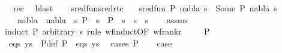 \begin{isabellebody}
\ {}{\isacharparenleft}{\kern0pt}{}{\isacharparenright}{\kern0pt}\ rec\ \isamarkupfalse%
\ blast\isanewline
\ \ \isamarkupfalse%
\isanewline
{}\isamarkupfalse%
%
\endisatagproof
{\isafoldproof}%
%
\isadelimproof
\isanewline
%
\endisadelimproof
\isanewline
{}\isamarkupfalse%
\ sred{\isacharunderscore}{\kern0pt}fun{\isacharunderscore}{\kern0pt}sred{\isacharunderscore}{\kern0pt}rtc{\isacharcolon}{\kern0pt}\isanewline
\ \ \ {\isachardoublequoteopen}sred{\isacharunderscore}{\kern0pt}fun\ {\isacharparenleft}{\kern0pt}P{\isacharcomma}{\kern0pt}\ nabla{\isacharcomma}{\kern0pt}\ s{\isacharparenright}{\kern0pt}\ {\isacharequal}{\kern0pt}\ Some\ {\isacharparenleft}{\kern0pt}P{\isacharprime}{\kern0pt}{\isacharcomma}{\kern0pt}\ nabla{\isacharprime}{\kern0pt}{\isacharcomma}{\kern0pt}\ s{\isacharprime}{\kern0pt}{\isacharparenright}{\kern0pt}{\isachardoublequoteclose}\isanewline
\ \ \ {\isachardoublequoteopen}nabla{\isacharprime}{\kern0pt}\ {\isacharequal}{\kern0pt}\ nabla\ {\isasymand}\ {\isacharparenleft}{\kern0pt}{\isasymexists}s{}{\isachardot}{\kern0pt}\ P\ {\isasymturnstile}\ s{}\ {\isasymleadsto}\isactrlsup {\isacharasterisk}{\kern0pt}\ P{\isacharprime}{\kern0pt}\ {\isasymand}\ s{\isacharprime}{\kern0pt}\ {\isacharequal}{\kern0pt}\ s{}\ {\isasymbullet}\ s{\isacharparenright}{\kern0pt}{\isachardoublequoteclose}\isanewline
%
\isadelimproof
\ \ %
\endisadelimproof
%
\isatagproof
{}\isamarkupfalse%
\ assms\isanewline
{}\isamarkupfalse%
{\isacharparenleft}{\kern0pt}induct\ P\ arbitrary{\isacharcolon}{\kern0pt}\ s\ rule{\isacharcolon}{\kern0pt}\ wf{\isacharunderscore}{\kern0pt}induct{\isacharbrackleft}{\kern0pt}OF\ wf{\isacharunderscore}{\kern0pt}rank{\isacharunderscore}{\kern0pt}r{\isacharbrackright}{\kern0pt}{\isacharparenright}{\kern0pt}\isanewline
\ \ \isamarkupfalse%
\ {\isacharparenleft}{\kern0pt}{}\ P{\isacharparenright}{\kern0pt}\isanewline
\ \ \isamarkupfalse%
\ eqs\ ys\ \ P{\isacharunderscore}{\kern0pt}def{\isacharcolon}{\kern0pt}\ {\isachardoublequoteopen}P\ {\isacharequal}{\kern0pt}\ {\isacharparenleft}{\kern0pt}eqs{\isacharcomma}{\kern0pt}\ ys{\isacharparenright}{\kern0pt}{\isachardoublequoteclose}\ \isamarkupfalse%
\ {\isacharparenleft}{\kern0pt}cases\ P{\isacharparenright}{\kern0pt}\isanewline
\ \ \isamarkupfalse%
\ {\isacharquery}{\kern0pt}case\isanewline

\end{isabellebody}
